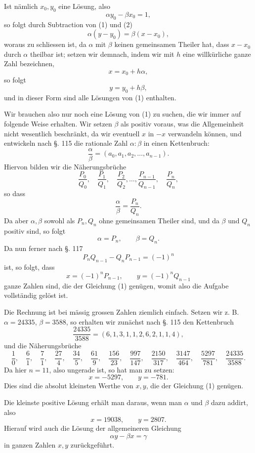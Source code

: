 \documentclass[11pt]{article}
\begin{document}
Ist nämlich $x_0,y_0$ eine Lösung, also
\[
\tag{2}        \alpha y_0-\beta x_0=1,
\]
so folgt durch Subtraction von (1) und (2)
\[
        \alpha(y-y_0)=\beta(x-x_0),
\]
woraus zu schliessen ist, da $\alpha$ mit $\beta$ keinen gemeinsamen Theiler hat, dass $x-x_0$ durch $\alpha$ theilbar ist; setzen wir demnach, indem wir mit $h$ eine willkürliche ganze Zahl bezeichnen,
\[
        x=x_0+h\alpha,
\]
so folgt
\[
        y=y_0+h\beta,
\]
und in dieser Form sind alle Lösungen von (1) enthalten.

Wir brauchen also nur noch eine Lösung von (1) zu suchen, die wir immer auf folgende Weise erhalten. Wir setzen $\beta$ als positiv voraus, was die Allgemeinheit nicht wesentlich beschränkt, da wir eventuell $x$ in $-x$ verwandeln können, und entwickeln nach §. 115 die rationale Zahl $\alpha:\beta$ in einen Kettenbruch:
\[
        \frac{\alpha}{\beta}=(a_0,a_1,a_2,\ldots,a_{n-1}).
\]
Hiervon bilden wir die Näherungsbrüche
\[
        \frac{P_0}{Q_0},\quad \frac{P_1}{Q_1},\quad \frac{P_2}{Q_2},\ldots,
        \frac{P_{n-1}}{Q_{n-1}},\quad \frac{P_n}{Q_n},
\]
so dass
\[
        \frac{\alpha}{\beta}=\frac{P_n}{Q_n}.
\]
Da aber $\alpha,\beta$ sowohl als $P_n,Q_n$ ohne gemeinsamen Theiler sind, und da $\beta$ und $Q_n$ positiv sind, so folgt
\[
        \alpha=P_n,
        \qquad
        \beta=Q_n.
\]
Da nun ferner nach §. 117
\[
        P_nQ_{n-1}-Q_nP_{n-1}=(-1)^n
\]
ist, so folgt, dass
\[
\tag{3}        x=(-1)^nP_{n-1},\qquad y=(-1)^nQ_{n-1}
\]
ganze Zahlen sind, die der Gleichung (1) genügen, womit also die Aufgabe vollständig gelöst ist.

Die Rechnung ist bei mässig grossen Zahlen ziemlich einfach. Setzen wir z. B. $\alpha=24335$, $\beta=3588$, so erhalten wir zunächst nach §. 115 den Kettenbruch
\[
        \frac{24335}{3588}=(6,1,3,1,1,2,6,2,1,1,4),
\]
und die Näherungsbrüche
\[
\frac10,\quad \frac61,\quad \frac71,\quad \frac{27}4,
\quad \frac{34}5,
\quad \frac{61}9,
\quad \frac{156}{23},
\quad \frac{997}{147},
\quad \frac{2150}{317},
\quad \frac{3147}{464},
\quad \frac{5297}{781},
\quad \frac{24335}{3588}.
\]
Da hier $n=11$, also ungerade ist, so hat man zu setzen:
\[
        x=-5297,
        \qquad
        y=-781.
\]
Dies sind die absolut kleinsten Werthe von $x,y$, die der Gleichung (1) genügen.

Die kleinste positive Lösung erhält man daraus, wenn man $\alpha$ und $\beta$ dazu addirt, also
\[
        x=19038,
        \qquad
        y=2807.
\]
Hierauf wird auch die Lösung der allgemeineren Gleichung
\[
\tag{4}        \alpha y-\beta x=\gamma
\]
in ganzen Zahlen $x,y$ zurückgeführt.
\end{document}

